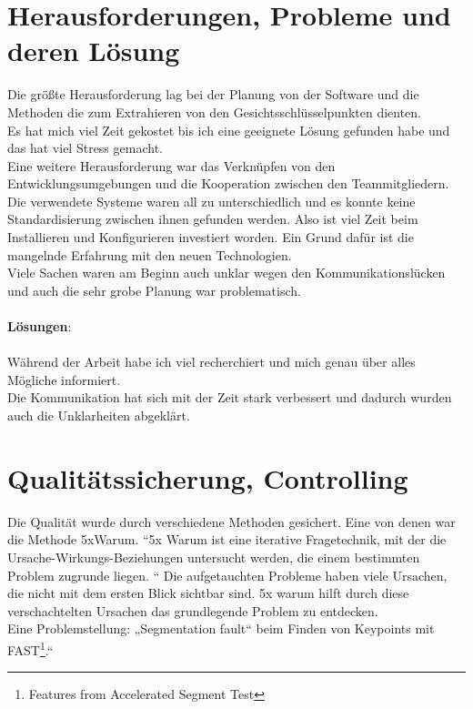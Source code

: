 \section{Herausforderungen, Probleme und deren Lösung }

Die größte Herausforderung lag bei der Planung von der Software und die Methoden die zum Extrahieren von den Gesichtsschlüsselpunkten dienten.\\
 Es hat mich viel Zeit gekostet bis ich eine geeignete Lösung gefunden habe und das hat viel Stress gemacht. \\
Eine weitere Herausforderung war das Verknüpfen von den Entwicklungsumgebungen  und die Kooperation zwischen den Teammitgliedern. \\
Die verwendete Systeme waren all zu unterschiedlich und es konnte keine Standardisierung zwischen ihnen gefunden werden. Also ist viel Zeit beim Installieren und Konfigurieren investiert worden. Ein Grund dafür ist die mangelnde Erfahrung mit den neuen Technologien. \\
Viele Sachen waren am Beginn auch unklar wegen den Kommunikationslücken und auch die sehr grobe Planung war problematisch. \\\\

\textbf{Lösungen}: \\\\
Während der Arbeit habe ich viel recherchiert und mich genau über alles Mögliche informiert. \\
Die Kommunikation hat sich mit der Zeit stark verbessert und dadurch wurden auch die Unklarheiten abgeklärt. \\

\section{Qualitätssicherung, Controlling}
Die Qualität wurde durch verschiedene Methoden gesichert. Eine von denen war die Methode 5xWarum. 
“5x Warum ist eine iterative Fragetechnik, mit der die Ursache-Wirkungs-Beziehungen untersucht werden, die einem bestimmten Problem zugrunde liegen. “
\cite{fmea}
Die aufgetauchten Probleme haben viele Ursachen, die nicht mit dem ersten Blick sichtbar sind. 5x warum hilft durch diese verschachtelten Ursachen das grundlegende Problem zu entdecken. \\
Eine Problemstellung: „Segmentation fault“ beim Finden von Keypoints mit FAST\footnote{Features from Accelerated Segment Test}.“\\ 

